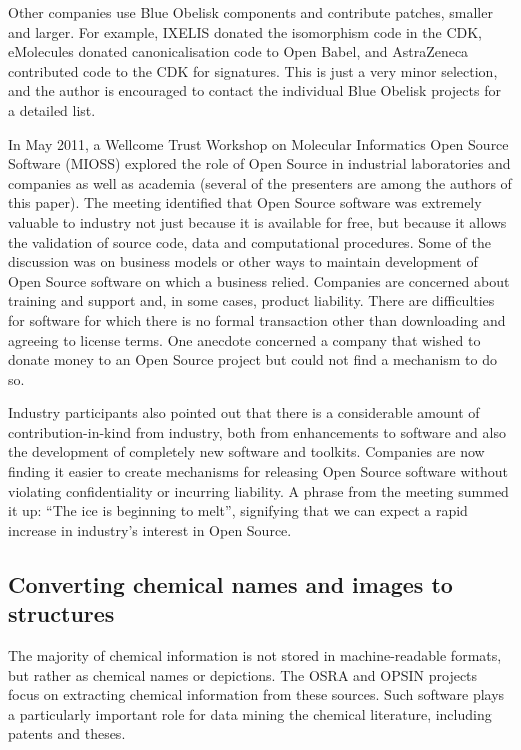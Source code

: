 \documentclass[10pt]{bmc_article}
\newenvironment{bmcformat}{\fussy\setboolean{publ}{true}}{\fussy}
\begin{document}
\begin{bmcformat}
Other companies use Blue Obelisk components and contribute patches,
smaller and larger. For example, IXELIS donated the isomorphism
code in the CDK, eMolecules donated canonicalisation code to
Open Babel, and AstraZeneca contributed code to the CDK for
signatures. This is just a very minor selection, and the author
is encouraged to contact the individual Blue Obelisk projects
for a detailed list.

In May 2011, a Wellcome Trust Workshop on
Molecular Informatics Open Source Software (MIOSS) explored the role of
Open Source in industrial laboratories and companies as well as
academia (several of
the presenters are among the authors of this paper).
The meeting identified that Open Source software was extremely valuable to
industry not just because it is available for free,
but because it allows the validation of source code, data and
computational procedures. Some 
of the discussion was on business models or other ways to maintain 
development of Open Source software on which a business relied.
Companies are concerned about training and support
and, in some cases, product liability.  There are difficulties
for software for which there is no formal
transaction other than downloading and agreeing to license terms.
One anecdote concerned a company
that wished to donate money to an Open Source
project but could not find a mechanism to do so.

Industry participants also pointed out that 
there is a considerable amount of
contribution-in-kind from industry, both from
enhancements to software and also the development of completely new
software and toolkits. Companies are now finding it easier to create
mechanisms for releasing Open Source software
without violating confidentiality or incurring liability.
A phrase from the meeting
summed it up: ``The ice is beginning to melt'', signifying that we can
expect a rapid increase in industry's interest
in Open Source.

\subsection*{Converting chemical names and images to structures}

The majority of chemical information is not stored in machine-readable
formats, but rather as chemical names or depictions. The OSRA and OPSIN
projects focus on extracting chemical information from these sources.
Such software plays a particularly important role for data mining the
chemical literature, including patents and theses.


\end{bmcformat}
\end{document}
